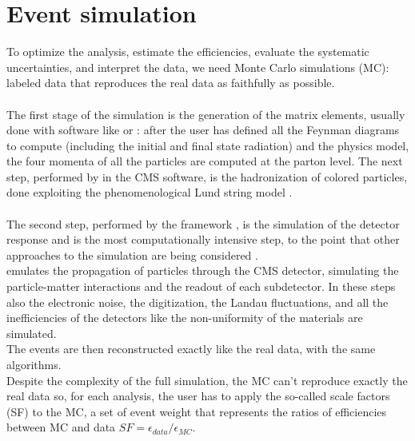 \section{Event simulation}
To optimize the analysis, estimate the efficiencies, evaluate the systematic uncertainties, and interpret the data, we need Monte Carlo simulations (MC): labeled data that reproduces the real data as faithfully as possible.\\
\\
The first stage of the simulation is the generation of the matrix elements, usually done with software like \MADGRAPH \cite{Alwall2011MadGraphBeyond} or \POWHEG \cite{Alioli2010ABOX}: after the user has defined all the Feynman diagrams to compute (including the initial and final state radiation) and the physics model, the four momenta of all the particles are computed at the parton level.
The next step, performed by \PYTHIA \cite{Sjostrand2006PYTHIAManual} in the CMS software, is the hadronization of colored particles, done exploiting the phenomenological Lund string model \cite{Andersson1983PartonDynamics}.\\
\\
The second step, performed by the \GEANTfour framework \cite{Agostinelli2003GEANT4--aToolkit}, is the simulation of the detector response and is the most computationally intensive step, to the point that other approaches to the simulation are being considered \cite{Sekmen2016RecentSimulation,Vaselli2023FlashSimFlow}.\\
\GEANT emulates the propagation of particles through the CMS detector, simulating the particle-matter interactions and the readout of each subdetector. In these steps also the electronic noise, the digitization, the Landau fluctuations, and all the inefficiencies of the detectors like the non-uniformity of the materials are simulated.\\
The events are then reconstructed exactly like the real data, with the same algorithms.\\
Despite the complexity of the full simulation, the MC can't reproduce exactly the real data so, for each analysis, the user has to apply the so-called scale factors (SF) to the MC, a set of event weight that represents the ratios of efficiencies between MC and data $SF=\epsilon_{data}/\epsilon_{MC}$.

